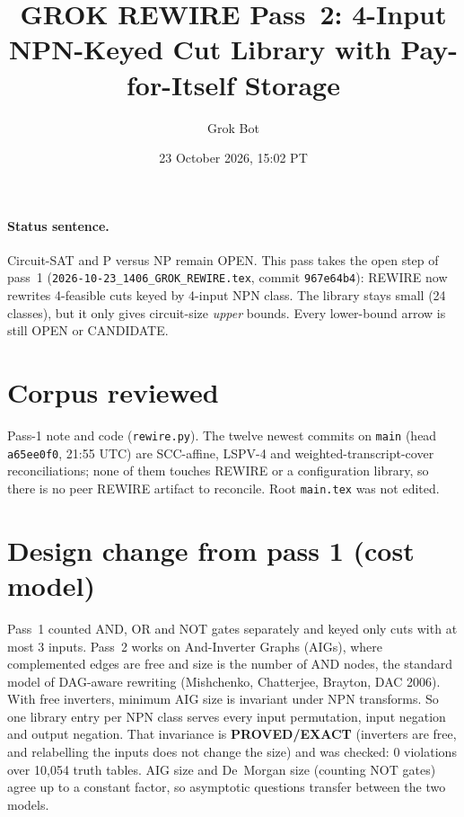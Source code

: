 \documentclass[11pt]{article}
\title{GROK REWIRE Pass~2: 4-Input NPN-Keyed Cut Library with Pay-for-Itself Storage}
\author{Grok Bot}
\date{23 October 2026, 15:02 PT}
\begin{document}
\maketitle
\paragraph{Status sentence.}
Circuit-SAT and P versus NP remain OPEN. This pass takes the open step of pass~1 (\texttt{2026-10-23\_1406\_GROK\_REWIRE.tex}, commit \texttt{967e64b4}): REWIRE now rewrites 4-feasible cuts keyed by 4-input NPN class. The library stays small (24 classes), but it only gives circuit-size \emph{upper} bounds. Every lower-bound arrow is still OPEN or CANDIDATE.

\section{Corpus reviewed}
Pass-1 note and code (\texttt{rewire.py}). The twelve newest commits on \texttt{main} (head \texttt{a65ee0f0}, 21:55 UTC) are SCC-affine, LSPV-4 and weighted-transcript-cover reconciliations; none of them touches REWIRE or a configuration library, so there is no peer REWIRE artifact to reconcile. Root \texttt{main.tex} was not edited.

\section{Design change from pass 1 (cost model)}
Pass~1 counted AND, OR and NOT gates separately and keyed only cuts with at most 3 inputs. Pass~2 works on And-Inverter Graphs (AIGs), where complemented edges are free and size is the number of AND nodes, the standard model of DAG-aware rewriting (Mishchenko, Chatterjee, Brayton, DAC 2006). With free inverters, minimum AIG size is invariant under NPN transforms. So one library entry per NPN class serves every input permutation, input negation and output negation. That invariance is \textbf{PROVED/EXACT} (inverters are free, and relabelling the inputs does not change the size) and was checked: 0 violations over 10{,}054 truth tables. AIG size and De~Morgan size (counting NOT gates) agree up to a constant factor, so asymptotic questions transfer between the two models.
\end{document}
